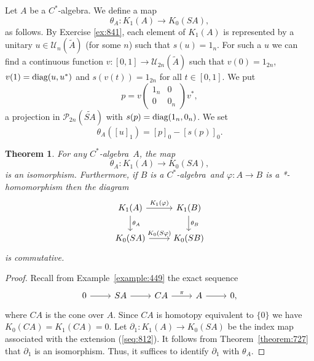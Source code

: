 \documentclass{book}
\newtheorem{theorem}[definition]{Theorem}
\def\cstar{\(C^*\)-algebra}
\def\diag{\textnormal{diag}}
\begin{document}
Let \(A\) be a \cstar. We define a map
\[
  \theta_A:K_1(A)\rightarrow K_0(S A),
\]
as follows. By Exercise \ref{ex:841}, each element of \(K_1(A)\) is represented by a unitary \(u\in \mathcal{U}_n(\tilde{A})\)
(for some \(n\)) such that \(s(u)=1_n\). For such a \(u\) we can find a continuous function
\(v:[0,1]\rightarrow\mathcal{U}_{2n}(\tilde{A})\) such that \(v(0)=1_{2n}\), \(v(1)=\diag(u,u^*)\) and \(s(v(t))=1_{2n}\) for all \(t\in [0,1]\). We put
\[
  p=v\begin{pmatrix}
    1_n&0\\0&0_n
  \end{pmatrix}v^*,
\]
  a projection in \(\mathcal{P}_{2n}(\widetilde{S A})\) with \(s(p)=\diag (1_n,0_n)\). We set
\[
  \theta_A({[u]}_1)={[p]}_0-{[s(p)]}_0.
\]
\begin{theorem}\label{theorem:812}
  For any \cstar\ \(A\), the map 
  \[
    \theta_A:K_1(A)\rightarrow K_0(S A),
  \]
  is an isomorphism. Furthermore, if \(B\) is a \cstar\ and \(\varphi:A\rightarrow B\) is a *-homomorphism then the diagram
  \[
    \begin{tikzcd}
      K_1(A)\arrow[r,"K_1(\varphi)"]\arrow[d,"\theta_A"]&K_1(B)\arrow[d,"\theta_B"]\\
      K_0(S A)\arrow[r,"K_0(S\varphi)"]&K_0(S B)
    \end{tikzcd}  
  \]
  is commutative.
\end{theorem}
\begin{proof}
  Recall from Example~\ref{example:449} the exact sequence
  \begin{equation}\label{seq:812}
    \begin{tikzcd}
      0\arrow[r]&S A \arrow[r]&C A\arrow[r,"\pi"]&A\arrow[r]&0,
    \end{tikzcd}
  \end{equation}
  where \(C A\) is the cone over \(A\). Since \(C A\) is homotopy equivalent to \(\{0\}\) we have 
  \(K_0(C A)=K_1(C A)=0\). Let \(\partial_1:K_1(A)\rightarrow K_0(S A)\) be the index map associated with the extension (\ref{seq:812}).
  It follows from Theorem~\ref{theorem:727} that \(\partial_1\) is an isomorphism. Thus, it suffices to identify \(\partial_1\) with \(\theta_A\).
\end{proof}
\end{document}
